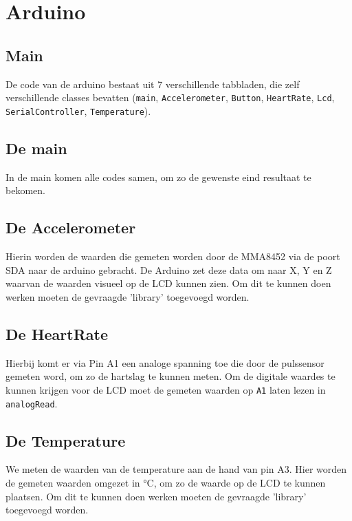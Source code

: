 \documentclass[a4paper]{report}
\newcommand{\code}[1]{\colorbox{light-gray}{\texttt{#1}}}
\begin{document}
    \section{Arduino}
        \subsection{Main}
            De code van de arduino bestaat uit 7 verschillende tabbladen, die zelf verschillende classes bevatten
            (\code{main}, \code{Accelerometer}, \code{Button}, \code{HeartRate}, \code{Lcd}, \code{SerialController}, \code{Temperature}).
            \subsection{De main}
                In de main komen alle codes samen, om zo de gewenste eind resultaat te bekomen.
                
            \subsection{De Accelerometer}
                Hierin worden de waarden die gemeten worden door de MMA8452 \cite{accel5} via de poort SDA naar de arduino gebracht.
                De Arduino zet deze data om naar X, Y en Z waarvan de waarden visueel op de LCD \cite{lcd1} kunnen zien.
                Om dit te kunnen doen werken moeten de gevraagde 'library' toegevoegd worden.
                
            \subsection{De HeartRate}
                Hierbij komt er via Pin A1 een analoge spanning toe die door de pulssensor \cite{heart7} gemeten word, om zo de hartslag te kunnen meten.
                Om de digitale waardes te kunnen krijgen voor de LCD \cite{lcd1} moet de gemeten waarden op \code{A1} laten lezen in \code{analogRead}.
                
            \subsection{De Temperature}
                We meten de waarden van de temperature \cite{temp1} aan de hand van pin A3.
                Hier worden de gemeten waarden omgezet in °C, om zo de waarde op de LCD \cite{lcd1} te kunnen plaatsen.
                Om dit te kunnen doen werken moeten de gevraagde 'library' toegevoegd worden.
                
\end{document}
